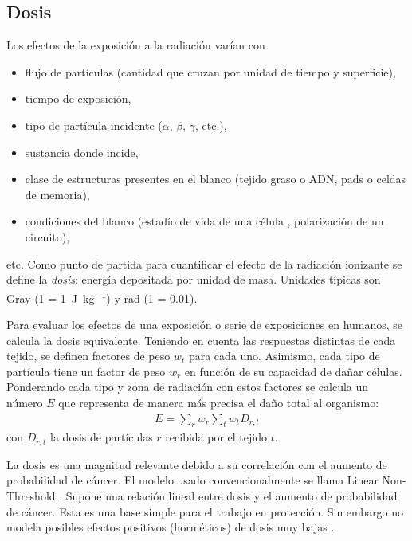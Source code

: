 \subsection{Dosis}
Los efectos de la exposición a la radiación varían con 
\begin{itemize}
    \item flujo de partículas 
        (cantidad que cruzan por unidad de tiempo y superficie),
    \item tiempo de exposición,
    \item tipo de partícula incidente ($\alpha$, $\beta$, $\gamma$, etc.),
    \item sustancia donde incide,
    \item clase de estructuras presentes en el blanco (tejido graso o ADN,
        pads o celdas de memoria),
    \item condiciones del blanco (estadío de vida de una célula
        \cite{podgorsak_radiation_2005}, polarización de un circuito),
\end{itemize}etc.
Como punto de partida para cuantificar el efecto de la radiación ionizante
se define la \emph{dosis}: energía depositada por unidad de masa.
Unidades típicas son Gray 
(\SI{1}{\Gray} = \SI{1}{\joule\per\kilo\gram}) 
y rad 
(\SI{1}{\rad} = \SI{0.01}{\Gray}).

Para evaluar los efectos de una exposición o serie de exposiciones en humanos,
se calcula la dosis equivalente\cite{martin_effective_2007}.
Teniendo en cuenta las respuestas distintas de cada tejido,
se definen factores de peso $w_t$ para cada uno.
Asimismo, cada tipo de partícula tiene un factor de peso $w_r$
en función de su capacidad de dañar células.
Ponderando cada tipo y zona de radiación con estos factores se calcula un
número $E$ que representa de manera más precisa el daño total al organismo:
\begin{align*}
    E = \sum_r w_r \sum_t w_t D_{r,t}
\end{align*}
con $D_{r,t}$ la dosis de partículas $r$ recibida por el tejido $t$.

La dosis es una magnitud relevante debido a su correlación
con el aumento de probabilidad de cáncer.
El modelo usado convencionalmente se llama Linear Non-Threshold
\cite{valentin_low-dose_2006}.
Supone una relación lineal entre dosis y el aumento de probabilidad de cáncer.
Esta es una base simple para el trabajo en protección.
Sin embargo no modela posibles efectos positivos (horméticos) 
de dosis muy bajas \cite{hooker_linear_2004}.
